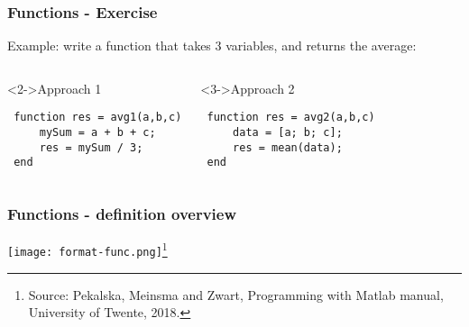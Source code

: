 \begin{frame}[fragile]
  \frametitle{Functions - Exercise}
  Example: write a function that takes 3 variables, and returns the average: \pause
   \begin{columns}[T]
    \begin{block}<2->{Approach 1}
  \begin{lstlisting}
 function res = avg1(a,b,c)
     mySum = a + b + c;
     res = mySum / 3;
 end \end{lstlisting}
    \end{block}
    \begin{block}<3->{Approach 2}
        \begin{lstlisting}
 function res = avg2(a,b,c)
     data = [a; b; c];
     res = mean(data);
 end \end{lstlisting}
    \end{block}
  \end{columns}
 \end{frame}

\begin{frame}[fragile]
  \frametitle{Functions - definition overview}
  \texttt{[image: format-func.png]}\footnote{Source: Pekalska, Meinsma and Zwart, Programming with Matlab manual, University of Twente, 2018.}
 \end{frame}


